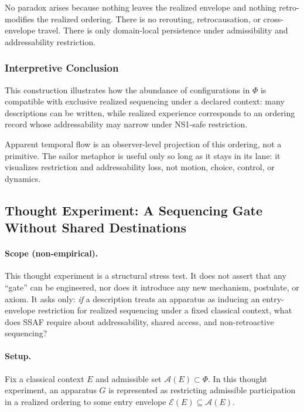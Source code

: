 \documentclass[aps,prx,onecolumn,11pt]{revtex4-2}
\theoremstyle{plain}
\theoremstyle{definition}
\theoremstyle{remark}
\begin{document}
No paradox arises because nothing leaves the realized envelope and
nothing retro-modifies the realized ordering. There is no rerouting,
retrocausation, or cross-envelope travel. There is only
domain-local persistence under admissibility and addressability
restriction.

\subsubsection{Interpretive Conclusion}

This construction illustrates how the abundance of configurations in
\(\Phi\) is compatible with exclusive realized sequencing under a
declared context: many descriptions can be written, while realized
experience corresponds to an ordering record whose addressability may
narrow under NS1-safe restriction.

Apparent temporal flow is an observer-level projection of this ordering,
not a primitive. The sailor metaphor is useful only so long as it stays
in its lane: it visualizes restriction and addressability loss, not
motion, choice, control, or dynamics.

\subsection{Thought Experiment: A Sequencing Gate Without Shared
Destinations}
\label{appC:thought_experiment_sequencing_gate}

\paragraph{Scope (non-empirical).}
This thought experiment is a structural stress test. It does not assert
that any ``gate'' can be engineered, nor does it introduce any new
mechanism, postulate, or axiom. It asks only: \emph{if} a description
treats an apparatus as inducing an entry-envelope restriction for
realized sequencing under a fixed classical context, what does SSAF
require about addressability, shared access, and non-retroactive
sequencing?

\paragraph{Setup.}
Fix a classical context $E$ and admissible set
$\mathcal{A}(E) \subset \Phi$. In this thought experiment, an
apparatus $G$ is represented as restricting admissible participation
in a realized ordering to some entry envelope
$\mathcal{E}(E) \subseteq \mathcal{A}(E)$.
\end{document}
